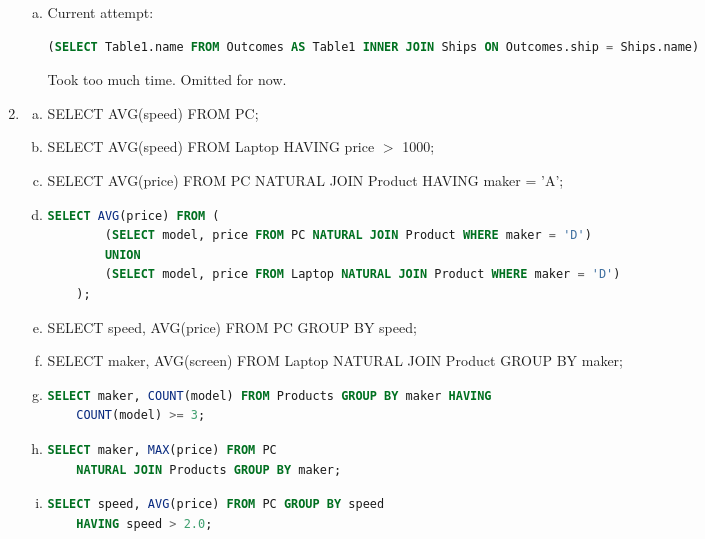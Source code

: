 \documentclass[12pt]{article}
\begin{document}
\begin{enumerate}[1.]
\begin{enumerate}[a)]
    \item

    Current attempt:

    \begin{lstlisting}[language=SQL]
    (SELECT Table1.name FROM Outcomes AS Table1 INNER JOIN Ships ON Outcomes.ship = Ships.name)
    \end{lstlisting}

    Took too much time. Omitted for now.

    \end{enumerate}

    \item

    \begin{enumerate}[a)]
        \item SELECT AVG(speed) FROM PC;
        \item SELECT AVG(speed) FROM Laptop HAVING price $>$ 1000;
        \item SELECT AVG(price) FROM PC NATURAL JOIN Product HAVING maker = 'A';
        \item

    \begin{lstlisting}[language=SQL]
    SELECT AVG(price) FROM (
        (SELECT model, price FROM PC NATURAL JOIN Product WHERE maker = 'D')
        UNION
        (SELECT model, price FROM Laptop NATURAL JOIN Product WHERE maker = 'D')
    );
    \end{lstlisting}
        \item SELECT speed, AVG(price) FROM PC GROUP BY speed;
        \item SELECT maker, AVG(screen) FROM Laptop NATURAL JOIN Product GROUP BY
        maker;
        \item

    \begin{lstlisting}[language=SQL]
    SELECT maker, COUNT(model) FROM Products GROUP BY maker HAVING
    COUNT(model) >= 3;
    \end{lstlisting}

        \item

    \begin{lstlisting}[language=SQL]
    SELECT maker, MAX(price) FROM PC
    NATURAL JOIN Products GROUP BY maker;
    \end{lstlisting}

        \item

    \begin{lstlisting}[language=SQL]
    SELECT speed, AVG(price) FROM PC GROUP BY speed
    HAVING speed > 2.0;
    \end{lstlisting}
    \end{enumerate}


\end{enumerate}
\end{document}
